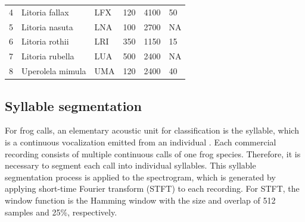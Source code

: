 \begin{table}[htb!]
{\begin{tabular}{llllll}
4            & Litoria fallax              & LFX                   & 120                                                                                 & 4100                                                                   & 50                                                                                   \\ 
5            & Litoria nasuta              & LNA                   & 100                                                                                 & 2700                                                                   & NA                                                                                   \\ 
6            & Litoria rothii              & LRI                   & 350                                                                                 & 1150                                                                   & 15                                                                                   \\ 
7            & Litoria rubella             & LUA                   & 500                                                                                 & 2400                                                                   & NA                                                                                   \\ 
8            & Uperolela mimula            & UMA                   & 120                                                                                 & 2400                                                                   & 40                                                                                   \\ \hline\hline
\end{tabular}
}
\end{table}




\subsection{Syllable segmentation}
For frog calls, an elementary acoustic unit for classification is the syllable, which is a continuous vocalization emitted from an individual \citep{huang2009frog}. Each commercial recording consists of multiple continuous calls of one frog species. Therefore, it is necessary to segment each call into individual syllables. This syllable segmentation process is applied to the spectrogram, which is generated by applying short-time Fourier transform (STFT) to each recording. For STFT, the window function is the Hamming window with the size and overlap of 512 samples and 25\%, respectively. 


